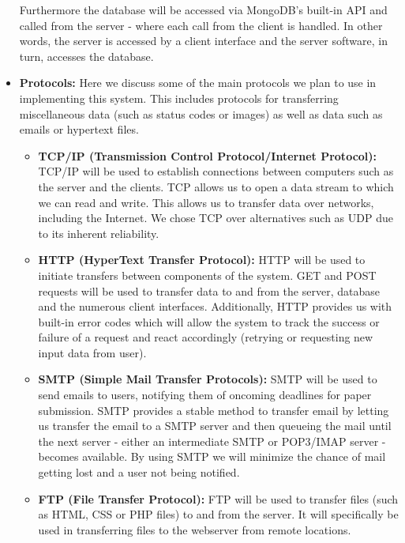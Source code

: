 \documentclass[a4paper,12pt]{article}
\begin{document}
\begin{itemize}
Furthermore the database will be accessed via MongoDB's built-in API and called from the server - where each call from the client is handled. In other words, the server is accessed by a client interface and the server software, in turn, accesses the database.

\item \textbf{Protocols:}
Here we discuss some of the main protocols we plan to use in implementing this system. This includes protocols for transferring miscellaneous data (such as status codes or images) as well as data such as emails or hypertext files.
\begin{itemize}
\item \textbf{TCP/IP (Transmission Control Protocol/Internet Protocol):}
TCP/IP will be used to establish connections between computers such as the server and the clients. TCP allows us to open a data stream to which we can read and write. This allows us to transfer data over networks, including the Internet. We chose TCP over alternatives such as UDP due to its inherent reliability.

\item \textbf{HTTP (HyperText Transfer Protocol):}
HTTP will be used to initiate transfers between components of the system. GET and POST requests will be used to transfer data to and from the server, database and the numerous client interfaces. Additionally, HTTP provides us with built-in error codes which will allow the system to track the success or failure of a request and react accordingly (retrying or requesting new input data from user).

\item \textbf{SMTP (Simple Mail Transfer Protocols):}
SMTP will be used to send emails to users, notifying them of oncoming deadlines for paper submission. SMTP provides a stable method to transfer email by letting us transfer the email to a SMTP server and then queueing the mail until the next server - either an intermediate SMTP or POP3/IMAP server - becomes available. By using SMTP we will minimize the chance of mail getting lost and a user not being notified.

\item \textbf{FTP (File Transfer Protocol):}
FTP will be used to transfer files (such as HTML, CSS or PHP files) to and from the server. It will specifically be used in transferring files to the webserver from remote locations.
\end{itemize}
\end{itemize}
\end{document}
